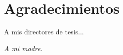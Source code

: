 %



\chapter* {Agradecimientos}

A mis directores de tesis...


\cleardoublepage


\thispagestyle{empty}
\bigskip
\bigskip
\bigskip
\bigskip
\begin{flushright}
{\em A mi madre.}
\end{flushright}
\bigskip

%